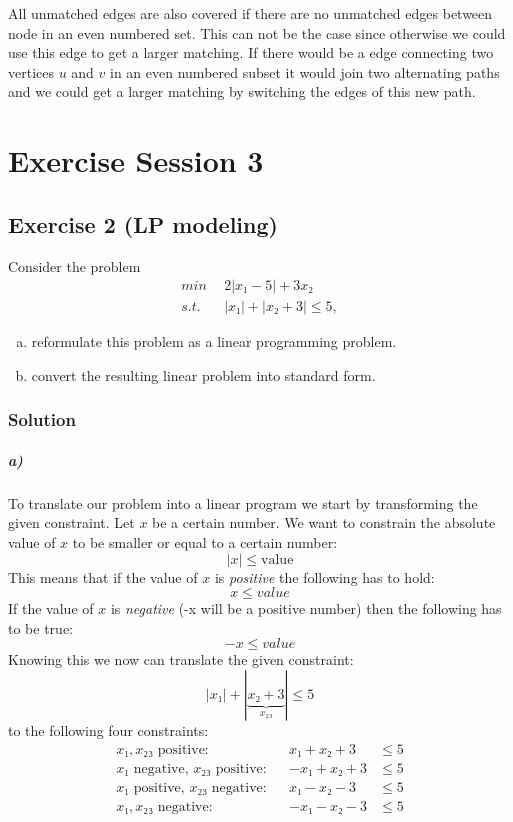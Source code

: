 \documentclass[a4paper, 12pt]{report}
\begin{document}
All unmatched edges are also covered if there are no unmatched edges between
node in an even numbered set. This can not be the case since otherwise we could
use this edge to get a larger matching. If there would be a edge connecting two
vertices $u$ and $v$ in an even numbered subset it would join two alternating
paths and we could get a larger matching by switching the edges of this new
path.

\chapter{Exercise Session 3}

\section{Exercise 2 (LP modeling)}

Consider the problem
\begin{align*}
    min  ~&~ 2|x₁ − 5| + 3x₂\\
    s.t. ~&~ |x₁| + |x₂ + 3| ≤ 5,
\end{align*}

\begin{enumerate}[a)]
    \item reformulate this problem as a linear programming problem.
    \item convert the resulting linear problem into standard form.
\end{enumerate}

\subsection{Solution}

\paragraph{a)} To translate our problem into a linear program we start by
transforming the given constraint. Let $x$ be a certain number. We want to
constrain the absolute value of $x$ to be smaller or equal to a certain number:
\[
    |x|≤\text{value}
\]
This means that if the value of $x$ is \emph{positive} the following has to
hold:
\[
    x≤value
\]
If the value of $x$ is \emph{negative} (-x will be a positive number) then the
following has to be true:
\[
    -x≤value
\]
Knowing this we now can translate the given constraint:
\[
    |x₁| + |\underbrace{x₂ + 3}_{x₂₃}| ≤ 5
\]
to the following four constraints:
\begin{align*}
    &&&& \text{$x₁, x₂₃$ positive:}            &&  x₁ + x₂ + 3  & ≤ 5 &&&&\\
    &&&& \text{$x₁$ negative, $x₂₃$ positive:} && -x₁ + x₂ + 3  & ≤ 5 &&&&\\
    &&&& \text{$x₁$ positive, $x₂₃$ negative:} &&  x₁ - x₂ - 3  & ≤ 5 &&&&\\
    &&&& \text{$x₁, x₂₃$ negative:}            && -x₁ - x₂ - 3  & ≤ 5 &&&&\\
\end{align*}
\end{document}
